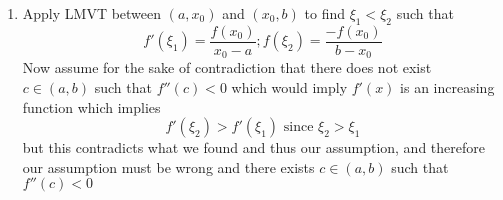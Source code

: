 \documentclass[12pt]{article}
\begin{document}
\begin{enumerate}
\begin{enumerate}
		\end{enumerate}
		\item
			Apply LMVT between $(a,x_{0})$ and $(x_{0}, b)$ to find $\xi_{1}<\xi_{2}$ such that
			$$
			f'(\xi_{1}) = \frac{f(x_{0})}{x_{0}-a}; f(\xi_{2}) = \frac{-f(x_{0})}{b-x_{0}}
			$$
			Now assume for the sake of contradiction that there does not exist $c \in (a,b)$ such that $f''(c)<0$ which would imply $f'(x)$ is an increasing function which implies
			$$
			f'(\xi_{2}) > f'(\xi_{1}) \text{ since } \xi_{2}>\xi_{1}
			$$
			but this contradicts what we found and thus our assumption, and therefore our assumption must be wrong and there exists $c \in (a,b)$ such that $f''(c)<0$
\end{enumerate}
\end{document}
